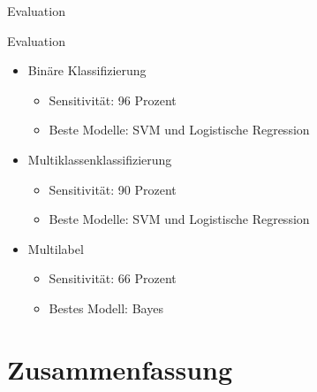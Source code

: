 \documentclass[aspectratio=169]{beamer} %
\begin{document}
\begin{frame}{Evaluation}
\begin{block}{Evaluation}
\begin{itemize}

\item Binäre Klassifizierung
\begin{itemize}
\item Sensitivität: 96 Prozent
\item Beste Modelle: SVM und Logistische Regression

\end{itemize} 
\item Multiklassenklassifizierung
\begin{itemize}
\item Sensitivität: 90 Prozent
\item Beste Modelle: SVM und Logistische Regression
\end{itemize}
\item Multilabel
\begin{itemize}
\item Sensitivität: 66 Prozent
\item Bestes Modell: Bayes
\end{itemize}

\end{itemize}

\end{block}


\end{frame}

\section{Zusammenfassung}
\end{document}
